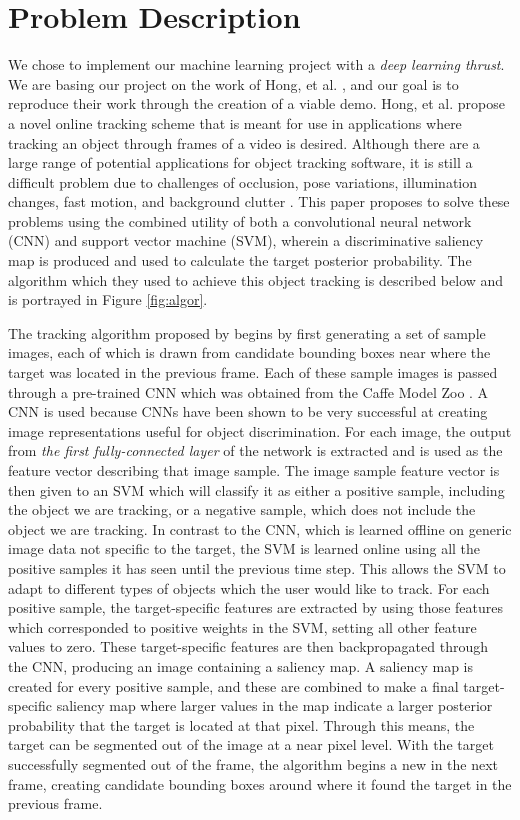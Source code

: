 \documentclass{sig-alternate-05-2015}
\begin{document}
\section{Problem Description}
We chose to implement our machine learning project with a \textit{deep learning thrust}.
We are basing our project on the work of Hong, et al. \cite{hong2015online}, and our goal is to reproduce their work through the creation of a viable demo.
Hong, et al. propose a novel online tracking scheme that is meant for use in applications where tracking an object through frames of a video is desired.
Although there are a large range of potential applications for object tracking software, it is still a difficult problem due to challenges of occlusion, pose variations, illumination changes, fast motion, and background clutter \cite{hong2015online}.
This paper proposes to solve these problems using the combined utility of both a convolutional neural network (CNN) and support vector machine (SVM), wherein a discriminative saliency map is produced and used to calculate the target posterior probability.
The algorithm which they used to achieve this object tracking is described below and is portrayed in Figure \ref{fig:algor}.

The tracking algorithm proposed by \cite{hong2015online} begins by first generating a set of sample images, each of which is drawn from candidate bounding boxes near where the target was located in the previous frame.
Each of these sample images is passed through a pre-trained CNN which was obtained from the Caffe Model Zoo \cite{jia2014caffe}.
A CNN is used because CNNs have been shown to be very successful at creating image representations useful for object discrimination.
For each image, the output from \textit{the first fully-connected layer} of the network is extracted and is used as the feature vector describing that image sample.
The image sample feature vector is then given to an SVM which will classify it as either a positive sample, including the object we are tracking, or a negative sample, which does not include the object we are tracking.
In contrast to the CNN, which is learned offline on generic image data not specific to the target, the SVM is learned online using all the positive samples it has seen until the previous time step.
This allows the SVM to adapt to different types of objects which the user would like to track.
For each positive sample, the target-specific features are extracted by using those features which corresponded to positive weights in the SVM, setting all other feature values to zero.
These target-specific features are then backpropagated through the CNN, producing an image containing a saliency map.
A saliency map is created for every positive sample, and these are combined to make a final target-specific saliency map where larger values in the map indicate a larger posterior probability that the target is located at that pixel.
Through this means, the target can be segmented out of the image at a near pixel level.
With the target successfully segmented out of the frame, the algorithm begins a new in the next frame, creating candidate bounding boxes around where it found the target in the previous frame.
\end{document}
